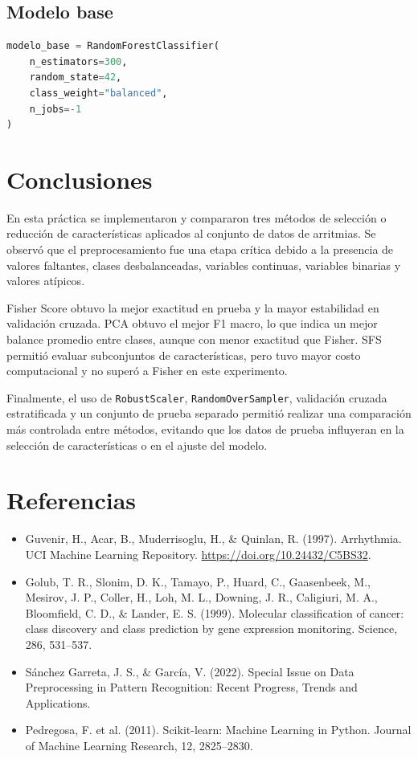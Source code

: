 \documentclass{article}
\begin{document}
\subsection*{Modelo base}
\begin{lstlisting}[language=Python]
modelo_base = RandomForestClassifier(
    n_estimators=300,
    random_state=42,
    class_weight="balanced",
    n_jobs=-1
)
\end{lstlisting}

\section{Conclusiones}

En esta práctica se implementaron y compararon tres métodos de selección o reducción de características aplicados al conjunto de datos de arritmias. Se observó que el preprocesamiento fue una etapa crítica debido a la presencia de valores faltantes, clases desbalanceadas, variables continuas, variables binarias y valores atípicos.

Fisher Score obtuvo la mejor exactitud en prueba y la mayor estabilidad en validación cruzada. PCA obtuvo el mejor F1 macro, lo que indica un mejor balance promedio entre clases, aunque con menor exactitud que Fisher. SFS permitió evaluar subconjuntos de características, pero tuvo mayor costo computacional y no superó a Fisher en este experimento.

Finalmente, el uso de \texttt{RobustScaler}, \texttt{RandomOverSampler}, validación cruzada estratificada y un conjunto de prueba separado permitió realizar una comparación más controlada entre métodos, evitando que los datos de prueba influyeran en la selección de características o en el ajuste del modelo.

\section{Referencias}

\begin{itemize}
    \item Guvenir, H., Acar, B., Muderrisoglu, H., \& Quinlan, R. (1997). Arrhythmia. UCI Machine Learning Repository. \url{https://doi.org/10.24432/C5BS32}.
    \item Golub, T. R., Slonim, D. K., Tamayo, P., Huard, C., Gaasenbeek, M., Mesirov, J. P., Coller, H., Loh, M. L., Downing, J. R., Caligiuri, M. A., Bloomfield, C. D., \& Lander, E. S. (1999). Molecular classification of cancer: class discovery and class prediction by gene expression monitoring. Science, 286, 531--537.
    \item Sánchez Garreta, J. S., \& García, V. (2022). Special Issue on Data Preprocessing in Pattern Recognition: Recent Progress, Trends and Applications.
    \item Pedregosa, F. et al. (2011). Scikit-learn: Machine Learning in Python. Journal of Machine Learning Research, 12, 2825--2830.
\end{itemize}
\end{document}
